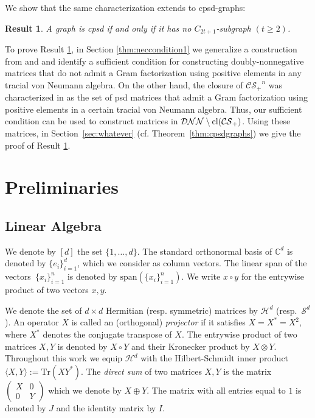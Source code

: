 \documentclass{siamart}
\newtheorem{thm}{Result}
\begin{document}
{{{{{We show} that the same characterization extends to  cpsd-graphs:
\medskip 
  \begin{thm}\label{res:third}
{A graph is cpsd  if and only if  it has no $C_{2t+1}$-subgraph $(t\ge 2)$.}
\end{thm}
\medskip

To prove Result \ref{res:third}, in Section \ref{thm:neccondition1} we generalize a construction from \cite{FW} and  \cite{LP14} and identify  a sufficient condition for constructing doubly-nonnegative matrices that do not admit a Gram factorization  using positive elements in any tracial von Neumann algebra. On the other hand,
 the closure of ${\mathcal{CS}_+}^n$  was  characterized  in  \cite[Theorem 4.6]{BLP} as
the set of psd matrices that admit a Gram
factorization using positive elements in a certain tracial   von
Neumann algebra.
  Thus,  our sufficient condition can be used to  construct matrices in ${\mathcal{DNN}}\setminus {\rm cl}  ({\mathcal{CS}_+})$. Using these matrices,
 in Section~\ref{sec:whatever} (cf. Theorem~\ref{thm:cpsdgraphs}) we give the proof of Result \ref{res:third}.
 
\vspace{1.1cm}
\section{Preliminaries}\label{sec:preliminaries}

\subsection*{Linear Algebra}

We denote by $[d]$ the set $\{1,\dotsc,d\}$.
The standard  orthonormal basis of ${\mathbb{C}}^d$ is denoted by $\{e_i\}_{i=1}^d$, which we consider as column vectors.
The linear span of the vectors~$\{x_i\}_{i=1}^n$ is  denoted by
${\mathrm{span}}({\{x_i\}_{i=1}^n})$.
We write $x\circ y$ for the entrywise product of two
vectors $x,y$.

We denote the set of $d\times d$ Hermitian (resp. symmetric)
matrices by ${\mathcal{H}}^d$ (resp.~${\mathcal{S}}^d$). An operator $X$ is called
an (orthogonal) {\em projector} if it satisfies $X=X^*=X^2$,
{where $X^*$ denotes  the conjugate transpose of $X$}. The
entrywise product of two matrices $X,Y$ is  denoted by $X\circ Y$
and their Kronecker product by $X\otimes Y$. Throughout this work we
equip ${\mathcal{H}}^d$ with the Hilbert-Schmidt inner product ${\langle}
X,Y{\rangle}:={\mathrm{Tr}}(XY^*)$. The {\em direct sum} of two matrices  $X, Y$ is
the matrix $\left(\begin{smallmatrix} X& 0\\0 &
Y\end{smallmatrix}\right)$ which we   denote by $X \oplus Y$.  The
matrix with all entries equal to $1$ is denoted by $J$ and the
identity matrix  by $I$.

}}}}
\end{document}
